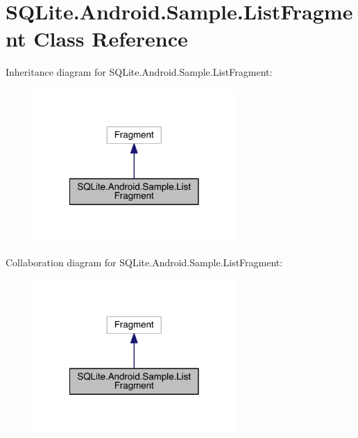 \hypertarget{class_s_q_lite_1_1_android_1_1_sample_1_1_list_fragment}{\section{S\+Q\+Lite.\+Android.\+Sample.\+List\+Fragment Class Reference}
\label{class_s_q_lite_1_1_android_1_1_sample_1_1_list_fragment}
}


Inheritance diagram for S\+Q\+Lite.\+Android.\+Sample.\+List\+Fragment\+:
\nopagebreak
\begin{figure}[H]
\begin{center}
\leavevmode
\includegraphics[width=218pt]{class_s_q_lite_1_1_android_1_1_sample_1_1_list_fragment__inherit__graph}
\end{center}
\end{figure}


Collaboration diagram for S\+Q\+Lite.\+Android.\+Sample.\+List\+Fragment\+:
\nopagebreak
\begin{figure}[H]
\begin{center}
\leavevmode
\includegraphics[width=218pt]{class_s_q_lite_1_1_android_1_1_sample_1_1_list_fragment__coll__graph}
\end{center}
\end{figure}
